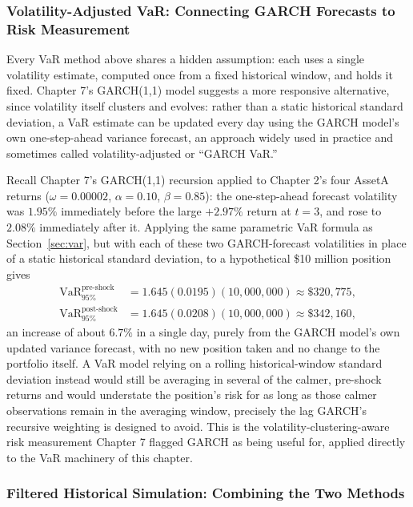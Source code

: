 \documentclass[../ai_in_finance]{subfiles}
\begin{document}
\subsubsection*{Volatility-Adjusted VaR: Connecting GARCH Forecasts to Risk Measurement}
\label{sec:garch-var}

Every VaR method above shares a hidden assumption: each uses a single volatility estimate, computed once from a fixed historical window, and holds it fixed. Chapter 7's GARCH(1,1) model suggests a more responsive alternative, since volatility itself clusters and evolves: rather than a static historical standard deviation, a VaR estimate can be updated every day using the GARCH model's own one-step-ahead variance forecast, an approach widely used in practice and sometimes called volatility-adjusted or ``GARCH VaR.''

Recall Chapter 7's GARCH(1,1) recursion applied to Chapter 2's four AssetA returns ($\omega=0.00002$, $\alpha=0.10$, $\beta=0.85$): the one-step-ahead forecast volatility was $1.95\%$ immediately before the large $+2.97\%$ return at $t=3$, and rose to $2.08\%$ immediately after it. Applying the same parametric VaR formula as Section~\ref{sec:var}, but with each of these two GARCH-forecast volatilities in place of a static historical standard deviation, to a hypothetical \$10 million position gives
\begin{align*}
\text{VaR}_{95\%}^{\text{pre-shock}} &= 1.645(0.0195)(10{,}000{,}000) \approx \$320{,}775, \\
\text{VaR}_{95\%}^{\text{post-shock}} &= 1.645(0.0208)(10{,}000{,}000) \approx \$342{,}160,
\end{align*}
an increase of about $6.7\%$ in a single day, purely from the GARCH model's own updated variance forecast, with no new position taken and no change to the portfolio itself. A VaR model relying on a rolling historical-window standard deviation instead would still be averaging in several of the calmer, pre-shock returns and would understate the position's risk for as long as those calmer observations remain in the averaging window, precisely the lag GARCH's recursive weighting is designed to avoid. This is the volatility-clustering-aware risk measurement Chapter 7 flagged GARCH as being useful for, applied directly to the VaR machinery of this chapter.

\subsubsection*{Filtered Historical Simulation: Combining the Two Methods}
\end{document}
